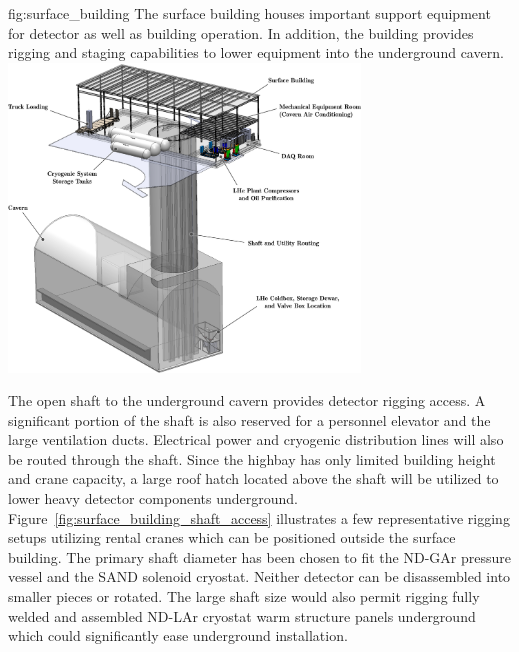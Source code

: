 \begin{dunefigure}{fig:surface_building}
{The surface building houses important support equipment for detector as well as building operation. In addition, the building provides rigging and staging capabilities to lower equipment into the underground cavern.}
\includegraphics[width=0.7\textwidth]{graphics/i-and-i/surface_building}
\end{dunefigure}

The open shaft to the underground cavern provides detector rigging access. A significant portion of the shaft is also reserved for a personnel elevator and the large ventilation ducts. Electrical power and cryogenic distribution lines will also be routed through the shaft. Since the highbay has only limited building height and crane capacity, a large roof hatch located above the shaft will be utilized to lower heavy detector components underground. Figure~\ref{fig:surface_building_shaft_access} illustrates a few representative rigging setups utilizing rental cranes which can be positioned outside the surface building. The primary shaft diameter has been chosen to fit the ND-GAr pressure vessel and the SAND solenoid cryostat. Neither detector can be disassembled into smaller pieces or rotated. The large shaft size would also permit rigging fully welded and assembled ND-LAr cryostat warm structure panels underground which could significantly ease underground installation. 

